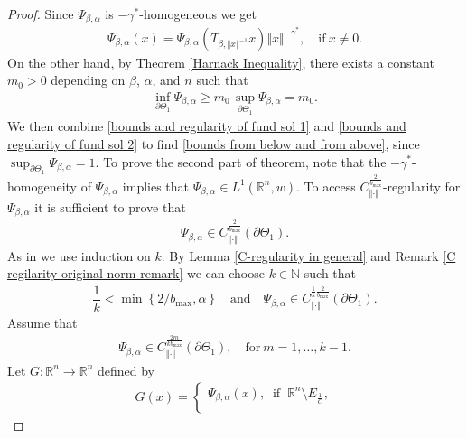 \documentclass[10pt, leqno]{article}
\theoremstyle{definition}
\theoremstyle{remark}
\numberwithin{equation}{section}
\begin{document}
\begin{proof}
Since $\Psi_{\beta, \alpha}$ is $-\gamma^{\ast}$-homogeneous we get
\begin{eqnarray}
\label{bounds and regularity of fund sol 1}
\Psi_{\beta, \alpha}(x)= \Psi_{\beta, \alpha}(T_{\beta, \Vert x \Vert^{-1}}x) \Vert x \Vert^{-\gamma^{\ast}}, \quad \text{if} \ x \neq 0.
\end{eqnarray}
On the other hand, by Theorem \ref{Harnack Inequality}, there exists a constant $m_{0}>0$ depending on $\beta$, $\alpha$, and $n$ such that
\begin{eqnarray}
\label{bounds and regularity of fund sol 2}
\displaystyle\inf_{\partial \Theta_{1}}\Psi_{\beta, \alpha}\geq m_{0} \, \displaystyle\sup_{\partial \Theta_{1}}\Psi_{\beta, \alpha} = m_{0}.
\end{eqnarray}
We then combine \eqref{bounds and regularity of fund sol 1} and \eqref{bounds and regularity of fund sol 2} to find \eqref{bounds from below and from above}, since $\displaystyle\sup_{\partial \Theta_{1}}\Psi_{\beta, \alpha} =1$. To prove the second part of theorem, note that the $-\gamma^{\ast}$-homogeneity of $\Psi_{\beta, \alpha}$ implies that $\Psi_{\beta, \alpha} \in L^{1}\left( \mathbb{R}^{n}, w \right)$. To access $C^{\frac{2}{b_{\max}}}_{\Vert \cdot \Vert}$-regularity for $\Psi_{\beta, \alpha}$ it is sufficient to prove that
\begin{eqnarray}
\Psi_{\beta, \alpha} \in C^{\frac{2}{b_{\max}}}_{\Vert \cdot \Vert}\left( \partial \Theta_{1} \right).
\end{eqnarray}
As in \cite{CWW} we use induction on $k$. By Lemma \ref{C-regularity in general} and Remark \ref{C regilarity original norm remark} we can choose $k \in \mathbb{N}$ such that
\begin{eqnarray}
\dfrac{1}{k} < \min \left\lbrace 2/b_{\max}, \alpha \right\rbrace \quad \text{and} \quad \Psi_{\beta, \alpha} \in C^{\frac{1}{k}\frac{2}{  b_{\max}}}_{\Vert \cdot \Vert}\left( \partial \Theta_{1} \right).
\end{eqnarray}
Assume that
\begin{eqnarray}
\label{induction hypothesis}
\Psi_{\beta, \alpha} \in C^{\frac{2m}{kb_{\max}}}_{\Vert \cdot \Vert}\left( \partial \Theta_{1} \right), \quad \text{for} \ m=1, \dots, k-1.
\end{eqnarray}
Let $G: \mathbb{R}^{n} \rightarrow \mathbb{R}^{n}$ defined by
\begin{eqnarray}
G(x)= \left \{
\begin{array}{ll}
\Psi_{\beta, \alpha}(x), \ \text{ if } \ \mathbb{R}^{n} \setminus E_{\frac{1}{C}}, \\

\end{array}
\end{eqnarray}
\end{proof}
\end{document}
